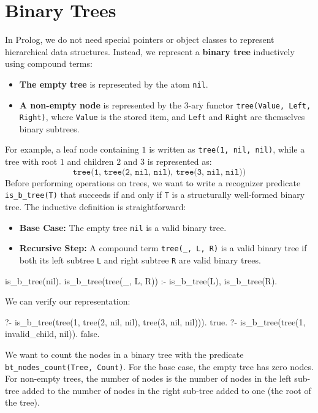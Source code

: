 \section{Binary Trees}
In Prolog, we do not need special pointers or object classes to represent hierarchical data structures. Instead, we represent a \textbf{binary tree} inductively using compound terms:
\begin{itemize}
    \item \textbf{The empty tree} is represented by the atom \texttt{nil}.
    \item \textbf{A non-empty node} is represented by the 3-ary functor \texttt{tree(Value, Left, Right)}, where \texttt{Value} is the stored item, and \texttt{Left} and \texttt{Right} are themselves binary subtrees.
\end{itemize}
For example, a leaf node containing $1$ is written as \texttt{tree(1, nil, nil)}, while a tree with root $1$ and children $2$ and $3$ is represented as:
\[
\texttt{tree(1, tree(2, nil, nil), tree(3, nil, nil))}
\]
Before performing operations on trees, we want to write a recognizer predicate \texttt{is\_b\_tree(T)} that succeeds if and only if \texttt{T} is a structurally well-formed binary tree.
The inductive definition is straightforward:
\begin{itemize}
    \item \textbf{Base Case:} The empty tree \texttt{nil} is a valid binary tree.
    \item \textbf{Recursive Step:} A compound term \texttt{tree(\_, L, R)} is a valid binary tree if both its left subtree \texttt{L} and right subtree \texttt{R} are valid binary trees.
\end{itemize}
\begin{codeblock}
is_b_tree(nil).
is_b_tree(tree(_, L, R)) :-
    is_b_tree(L),
    is_b_tree(R).
\end{codeblock}
We can verify our representation:
\begin{codeblock}
?- is_b_tree(tree(1, tree(2, nil, nil), tree(3, nil, nil))).
true.
?- is_b_tree(tree(1, invalid_child, nil)).
false.
\end{codeblock}


We want to count the nodes in a binary tree with the predicate \texttt{bt\_nodes\_count(Tree, Count)}. For the base case, the empty tree has zero nodes. For non-empty trees, the number of nodes is the number of nodes in the left sub-tree added to the number of nodes in the right sub-tree added to one (the root of the tree).

